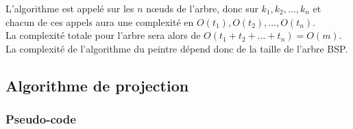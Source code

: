 \documentclass[11pt,a4paper]{article}
\theoremstyle{definition}
\theoremstyle{remark}
\begin{document}
L'algorithme est appelé sur les $n$ nœuds de l'arbre, donc sur $k_1, k_2, ... , k_n$ et chacun de ces appels aura une complexité en $O( t_1), O(t_2), ... , O(t_n)$.\\
La complexité totale pour l'arbre sera alors de $O(t_1 + t_2 + ... + t_n) = O(m)$. La complexité de l'algorithme du peintre dépend donc de la taille de l'arbre BSP.

\subsection{Algorithme de projection}

\subsubsection{Pseudo-code}
\end{document}
